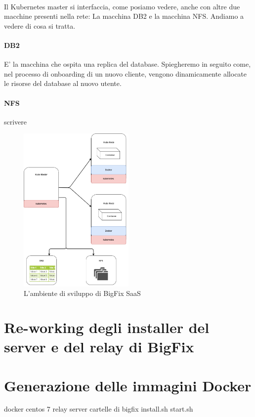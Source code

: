 \paragraph{}
Il Kubernetes master si interfaccia, come posiamo vedere, anche con altre due macchine presenti nella rete: La macchina DB2 e la macchina NFS. Andiamo a vedere di cosa si tratta.
\paragraph{DB2}
E' la macchina che ospita una replica del database. Spiegheremo in seguito come, nel processo di onboarding di un nuovo cliente, vengono dinamicamente allocate le risorse del database al nuovo utente.
\paragraph{NFS}
scrivere
\begin{figure}[h!]
	\centering
	\includegraphics[width=0.5\textwidth,keepaspectratio=true]{capitoli/imgs/EnvironmentsComponentDiagram.png}
	\caption{L'ambiente di sviluppo di BigFix SaaS}
\end{figure}


\section{Re-working degli installer del server e del relay di BigFix}

\section{Generazione delle immagini Docker}
docker centos 7 
relay
server
cartelle di bigfix
install.sh
start.sh

